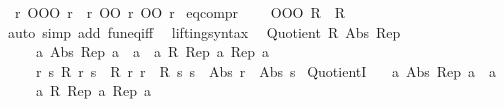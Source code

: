 \begin{isabellebody}
\isanewline
\ \ {\isachardoublequoteopen}r{}\ OOO\ r{}\ {\isasymequiv}\ r{}\ OO\ r{}\ OO\ r{}{\isachardoublequoteclose}\isanewline
\isanewline
{}\isamarkupfalse%
\ eq{\isacharunderscore}{\kern0pt}comp{\isacharunderscore}{\kern0pt}r{\isacharcolon}{\kern0pt}\isanewline
\ \ \ {\isachardoublequoteopen}{\isacharparenleft}{\kern0pt}{\isacharparenleft}{\kern0pt}{\isacharequal}{\kern0pt}{\isacharparenright}{\kern0pt}\ OOO\ R{\isacharparenright}{\kern0pt}\ {\isacharequal}{\kern0pt}\ R{\isachardoublequoteclose}\isanewline
%
\isadelimproof
\ \ %
\endisadelimproof
%
\isatagproof
{}\isamarkupfalse%
\ {\isacharparenleft}{\kern0pt}auto\ simp\ add{\isacharcolon}{\kern0pt}\ fun{\isacharunderscore}{\kern0pt}eq{\isacharunderscore}{\kern0pt}iff{\isacharparenright}{\kern0pt}%
\endisatagproof
{\isafoldproof}%
%
\isadelimproof
\isanewline
%
\endisadelimproof
\isanewline
{}\isamarkupfalse%
\ \ lifting{\isacharunderscore}{\kern0pt}syntax\isanewline
{}%
\isadelimdocument
%
\endisadelimdocument
%
\isatagdocument
%
\isamarkuptrue%
%
\endisatagdocument
{\isafolddocument}%
%
\isadelimdocument
%
\endisadelimdocument
{}\isamarkupfalse%
\isanewline
\ \ {\isachardoublequoteopen}Quotient{}\ R\ Abs\ Rep\ {\isasymlongleftrightarrow}\isanewline
\ \ \ \ \ {\isacharparenleft}{\kern0pt}{\isasymforall}a{\isachardot}{\kern0pt}\ Abs\ {\isacharparenleft}{\kern0pt}Rep\ a{\isacharparenright}{\kern0pt}\ {\isacharequal}{\kern0pt}\ a{\isacharparenright}{\kern0pt}\ {\isasymand}\ {\isacharparenleft}{\kern0pt}{\isasymforall}a{\isachardot}{\kern0pt}\ R\ {\isacharparenleft}{\kern0pt}Rep\ a{\isacharparenright}{\kern0pt}\ {\isacharparenleft}{\kern0pt}Rep\ a{\isacharparenright}{\kern0pt}{\isacharparenright}{\kern0pt}\ {\isasymand}\isanewline
\ \ \ \ \ {\isacharparenleft}{\kern0pt}{\isasymforall}r\ s{\isachardot}{\kern0pt}\ R\ r\ s\ {\isasymlongleftrightarrow}\ R\ r\ r\ {\isasymand}\ R\ s\ s\ {\isasymand}\ Abs\ r\ {\isacharequal}{\kern0pt}\ Abs\ s{\isacharparenright}{\kern0pt}{\isachardoublequoteclose}\isanewline
\isanewline
{}\isamarkupfalse%
\ Quotient{}I{\isacharcolon}{\kern0pt}\isanewline
\ \ \ {\isachardoublequoteopen}{\isasymAnd}a{\isachardot}{\kern0pt}\ Abs\ {\isacharparenleft}{\kern0pt}Rep\ a{\isacharparenright}{\kern0pt}\ {\isacharequal}{\kern0pt}\ a{\isachardoublequoteclose}\isanewline
\ \ \ \ \ {\isachardoublequoteopen}{\isasymAnd}a{\isachardot}{\kern0pt}\ R\ {\isacharparenleft}{\kern0pt}Rep\ a{\isacharparenright}{\kern0pt}\ {\isacharparenleft}{\kern0pt}Rep\ a{\isacharparenright}{\kern0pt}{\isachardoublequoteclose}\isanewline

\end{isabellebody}

